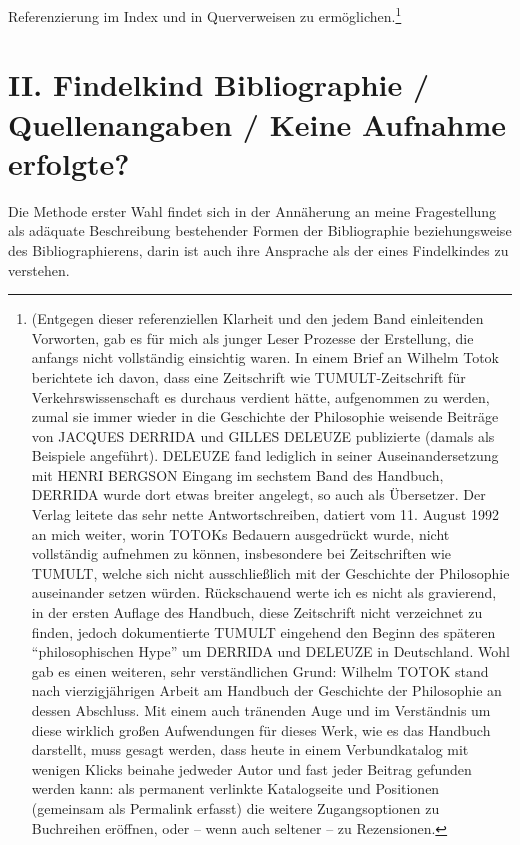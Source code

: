 \documentclass[a4paper,
fontsize=11pt,
oneside,
numbers=noperiodatend,
parskip=half-,
bibliography=totoc,
final
]{scrartcl}
\begin{document}
Referenzierung im Index und in Querverweisen zu ermöglichen.\footnote{(Entgegen
  dieser referenziellen Klarheit und den jedem Band einleitenden
  Vorworten, gab es für mich als junger Leser Prozesse der Erstellung,
  die anfangs nicht vollständig einsichtig waren. In einem Brief an
  Wilhelm Totok berichtete ich davon, dass eine Zeitschrift wie
  TUMULT-Zeitschrift für Verkehrswissenschaft es durchaus verdient
  hätte, aufgenommen zu werden, zumal sie immer wieder in die Geschichte
  der Philosophie weisende Beiträge von JACQUES DERRIDA und GILLES
  DELEUZE publizierte (damals als Beispiele angeführt). DELEUZE fand
  lediglich in seiner Auseinandersetzung mit HENRI BERGSON Eingang im
  sechstem Band des Handbuch, DERRIDA wurde dort etwas breiter angelegt,
  so auch als Übersetzer. Der Verlag leitete das sehr nette
  Antwortschreiben, datiert vom 11. August 1992 an mich weiter, worin
  TOTOKs Bedauern ausgedrückt wurde, nicht vollständig aufnehmen zu
  können, insbesondere bei Zeitschriften wie TUMULT, welche sich nicht
  ausschließlich mit der Geschichte der Philosophie auseinander setzen
  würden. Rückschauend werte ich es nicht als gravierend, in der ersten
  Auflage des Handbuch, diese Zeitschrift nicht verzeichnet zu finden,
  jedoch dokumentierte TUMULT eingehend den Beginn des späteren
  \enquote{philosophischen Hype} um DERRIDA und DELEUZE in Deutschland.
  Wohl gab es einen weiteren, sehr verständlichen Grund: Wilhelm TOTOK
  stand nach vierzigjährigen Arbeit am Handbuch der Geschichte der
  Philosophie an dessen Abschluss. Mit einem auch tränenden Auge und im
  Verständnis um diese wirklich großen Aufwendungen für dieses Werk, wie
  es das Handbuch darstellt, muss gesagt werden, dass heute in einem
  Verbundkatalog mit wenigen Klicks beinahe jedweder Autor und fast
  jeder Beitrag gefunden werden kann: als permanent verlinkte
  Katalogseite und Positionen (gemeinsam als Permalink erfasst) die
  weitere Zugangsoptionen zu Buchreihen eröffnen, oder -- wenn auch
  seltener -- zu Rezensionen.}

\section*{II. Findelkind Bibliographie / Quellenangaben / Keine
Aufnahme
erfolgte?}\label{ii.-findelkind-bibliographie-quellenangaben-keine-aufnahme-erfolgte}

Die Methode erster Wahl findet sich in der Annäherung an meine
Fragestellung als adäquate Beschreibung bestehender Formen der
Bibliographie beziehungsweise des Bibliographierens, darin ist auch ihre
Ansprache als der eines Findelkindes zu verstehen.
\end{document}
